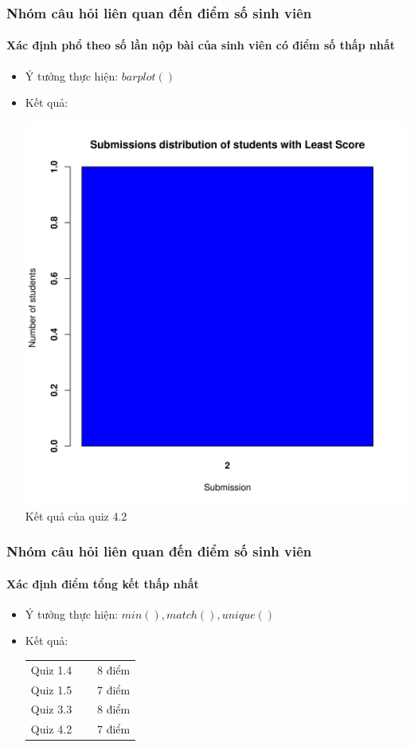 \documentclass[english,10pt,table]{beamer}
\begin{document}
\frame
{
\frametitle{Nhóm câu hỏi liên quan đến điểm số sinh viên}
\framesubtitle{Xác định phổ theo số lần nộp bài của sinh viên có điểm số thấp nhất}
\begin{itemize}
    \item Ý tưởng thực hiện: $barplot()$
    \item Kết quả:\\
    \begin{center}
        \includegraphics[width = 6 cm]{Images/img2-1-4.png}\\
        Kết quả của quiz 4.2
    \end{center}
\end{itemize}
}

\frame
{
\frametitle{Nhóm câu hỏi liên quan đến điểm số sinh viên}
\framesubtitle{Xác định điểm tổng kết thấp nhất}
\begin{itemize}
    \item Ý tưởng thực hiện: $min(), match(), unique()$
    \item Kết quả:\\
    \begin{center}
        \begin{tabular}{l l r}
             Quiz 1.4 & $\;$ & 8 điểm\\
             Quiz 1.5 & $\;$ & 7 điểm\\
             Quiz 3.3 & $\;$ & 8 điểm\\
             Quiz 4.2 & $\;$ & 7 điểm
        \end{tabular}
    \end{center}
\end{itemize}
}
\end{document}
